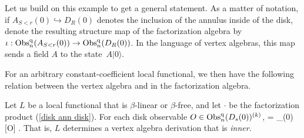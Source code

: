 Let us build on this example to get a general statement.
As a matter of notation, if $A_{S<r}(0) \hookrightarrow D_R(0)$ denotes the inclusion of the annulus inside of the disk, 
denote the resulting structure map of the factorization algebra by $\iota : {\rm Obs}^{{\rm q}}_n(A_{S<r}(0)) \to {\rm Obs}^{{\rm q}}_n(D_R(0))$. 
In the language of vertex algebras, this map sends a field $A$ to the state~$A |0\rangle$.

For an arbitrary constant-coefficient local functional, 
we then have the following relation between the vertex algebra and in the factorization algebra.

\begin{lemma}\label{zero fourier mode} 
Let $L$ be a local functional that is $\beta$-linear or $\beta$-free, 
and let $\cdot$ be the factorization product (\ref{disk ann disk}). 
For each disk observable $O \in {\rm Obs}^{{\rm q}}_n(D_s(0))^{(k)}$, 
 = _{(0)} [O] .
\een
That is, $L$ determines a vertex algebra derivation that is {\em inner}.
\end{lemma}

